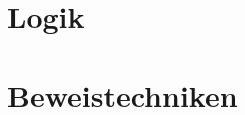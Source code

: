\documentclass[../main.tex]{subfiles}
\begin{document}
	
	\section{Logik}\label{section:Logik}
	
	
	\section{Beweistechniken}\label{section:Beweistechniken}
	
\end{document}
